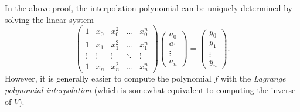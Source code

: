 In the above proof, the interpolation polynomial can be uniquely determined by solving the linear system 
$$\begin{pmatrix}
    1 & x_0 & x_0^2 & \dots & x_0^n \\
    1 & x_1 & x_1^2 & \dots & x_1^n \\
    \vdots & \vdots &\vdots & \ddots & \vdots\\
    1 & x_n & x_n^2 & \dots & x_n^n
\end{pmatrix} \begin{pmatrix}
    a_0\\a_1\\\vdots\\a_n
\end{pmatrix} = \begin{pmatrix}
    y_0\\y_1\\\vdots \\y_n
\end{pmatrix}.$$ 
However, it is generally easier to compute the polynomial $f$ with the \emph{Lagrange polynomial interpolation} (which is somewhat equivalent to computing the inverse of $V$).
